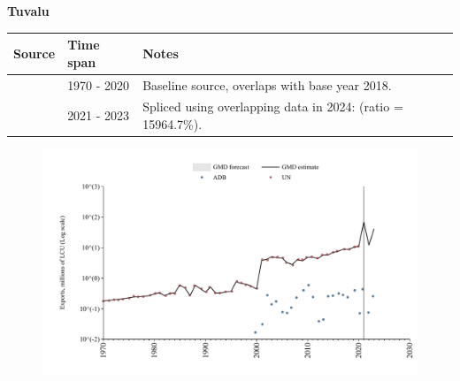 \documentclass[12pt,a4paper,landscape]{article}
\begin{document}
\begin{adjustbox}{max totalsize={\paperwidth}{\paperheight},center}
\begin{minipage}[t][\textheight][t]{\textwidth}
\vspace*{0.5cm}
{}
\begin{center}
{\Large\bfseries Tuvalu}
\end{center}
\vspace{0.5cm}
\begin{table}[H]
\centering
\small
\begin{tabular}{|l|l|l|}
\hline
\textbf{Source} & \textbf{Time span} & \textbf{Notes} \\
\hline
\rowcolor{white}\cite{UN}& 1970 - 2020 &Baseline source, overlaps with base year 2018.\\
\rowcolor{lightgray}\cite{ADB}& 2021 - 2023 &Spliced using overlapping data in 2024: (ratio = 15964.7\%).\\
\hline
\end{tabular}
\end{table}
\begin{figure}[H]
\centering
\includegraphics[width=\textwidth,height=0.6\textheight,keepaspectratio]{graphs/TUV_exports.pdf}
\end{figure}
\end{minipage}
\end{adjustbox}
\end{document}
